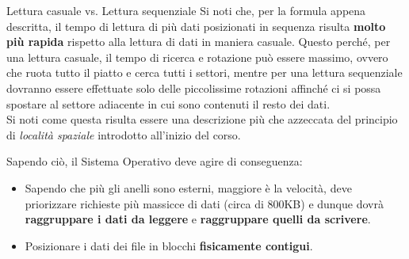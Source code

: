 \documentclass[12pt]{report}
\begin{document}
	\begin{osservazione}{Lettura casuale vs. Lettura sequenziale}{}
		Si noti che, per la formula appena descritta, il tempo di lettura di più dati posizionati in sequenza risulta \textbf{molto più rapida} rispetto alla lettura di dati in maniera casuale. Questo perché, per una lettura casuale, il tempo di ricerca e rotazione può essere massimo, ovvero che ruota tutto il piatto e cerca tutti i settori, mentre per una lettura sequenziale dovranno essere effettuate solo delle piccolissime rotazioni affinché ci si possa spostare al settore adiacente in cui sono contenuti il resto dei dati.\\
		Si noti come questa risulta essere una descrizione più che azzeccata del principio di \textit{località spaziale} introdotto all'inizio del corso.
	\end{osservazione}
	Sapendo ciò, il Sistema Operativo deve agire di conseguenza:
	\begin{itemize}
		\item Sapendo che più gli anelli sono esterni, maggiore è la velocità, deve priorizzare richieste più massicce di dati (circa di 800KB) e dunque dovrà \textbf{raggruppare i dati da leggere} e \textbf{raggruppare quelli da scrivere}.
		
		\item Posizionare i dati dei file in blocchi \textbf{fisicamente contigui}.
	\end{itemize}
	
\end{document}

